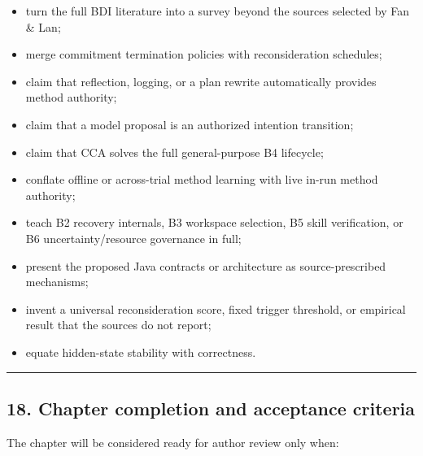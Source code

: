 \begin{itemize}
\tightlist
\item
  turn the full BDI literature into a survey beyond the sources selected by Fan \& Lan;
\item
  merge commitment termination policies with reconsideration schedules;
\item
  claim that reflection, logging, or a plan rewrite automatically provides method authority;
\item
  claim that a model proposal is an authorized intention transition;
\item
  claim that CCA solves the full general-purpose B4 lifecycle;
\item
  conflate offline or across-trial method learning with live in-run method authority;
\item
  teach B2 recovery internals, B3 workspace selection, B5 skill verification, or B6 uncertainty/resource governance in full;
\item
  present the proposed Java contracts or architecture as source-prescribed mechanisms;
\item
  invent a universal reconsideration score, fixed trigger threshold, or empirical result that the sources do not report;
\item
  equate hidden-state stability with correctness.
\end{itemize}

\begin{center}\rule{0.5\linewidth}{0.5pt}\end{center}

\subsection{18. Chapter completion and acceptance criteria}\label{chapter-completion-and-acceptance-criteria}

The chapter will be considered ready for author review only when:

